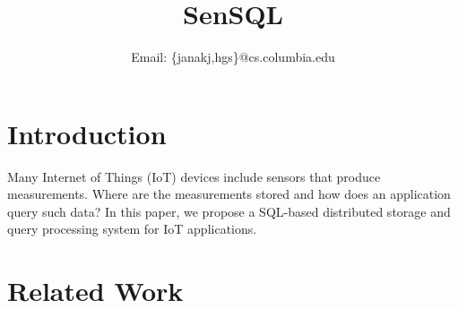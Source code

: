 \documentclass[conference,10pt]{IEEEtran}
\newcommand{\papertitle}{SenSQL}
\begin{document}
\title{\papertitle}

\author{
  Email: \{janakj,hgs\}@cs.columbia.edu
}

\maketitle

\begin{abstract}
\end{abstract}

\section{Introduction}
\label{sec:introduction}

Many Internet of Things (IoT) devices include sensors that produce measurements. Where are the measurements stored and how does an application query such data? In this paper, we propose a SQL-based distributed storage and query processing system for IoT applications.

\section{Related Work}
\label{sec:related-work}

\nocite{madden2005tinydb}
\nocite{madden2002supporting}
\nocite{bacon2017spanner}
\nocite{sun2010querying}
\nocite{rfc5222}
\nocite{rfc5582}
\nocite{rfc5012}
\nocite{rfc8428}



\end{document}
